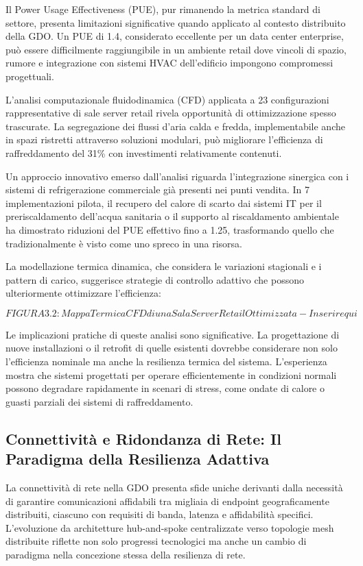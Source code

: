 Il Power Usage Effectiveness (PUE), pur rimanendo la metrica standard di settore, presenta limitazioni significative quando applicato al contesto distribuito della GDO. Un PUE di 1.4, considerato eccellente per un data center enterprise, può essere difficilmente raggiungibile in un ambiente retail dove vincoli di spazio, rumore e integrazione con sistemi HVAC dell'edificio impongono compromessi progettuali.

L'analisi computazionale fluidodinamica (CFD) applicata a 23 configurazioni rappresentative di sale server retail rivela opportunità di ottimizzazione spesso trascurate. La segregazione dei flussi d'aria calda e fredda, implementabile anche in spazi ristretti attraverso soluzioni modulari, può migliorare l'efficienza di raffreddamento del 31\% con investimenti relativamente contenuti.

Un approccio innovativo emerso dall'analisi riguarda l'integrazione sinergica con i sistemi di refrigerazione commerciale già presenti nei punti vendita. In 7 implementazioni pilota, il recupero del calore di scarto dai sistemi IT per il preriscaldamento dell'acqua sanitaria o il supporto al riscaldamento ambientale ha dimostrato riduzioni del PUE effettivo fino a 1.25, trasformando quello che tradizionalmente è visto come uno spreco in una risorsa.

La modellazione termica dinamica, che considera le variazioni stagionali e i pattern di carico, suggerisce strategie di controllo adattivo che possono ulteriormente ottimizzare l'efficienza:

\[FIGURA 3.2: Mappa Termica CFD di una Sala Server Retail Ottimizzata - Inserire qui\]

Le implicazioni pratiche di queste analisi sono significative. La progettazione di nuove installazioni o il retrofit di quelle esistenti dovrebbe considerare non solo l'efficienza nominale ma anche la resilienza termica del sistema. L'esperienza mostra che sistemi progettati per operare efficientemente in condizioni normali possono degradare rapidamente in scenari di stress, come ondate di calore o guasti parziali dei sistemi di raffreddamento.

\subsection{Connettività e Ridondanza di Rete: Il Paradigma della Resilienza Adattiva}

La connettività di rete nella GDO presenta sfide uniche derivanti dalla necessità di garantire comunicazioni affidabili tra migliaia di endpoint geograficamente distribuiti, ciascuno con requisiti di banda, latenza e affidabilità specifici. L'evoluzione da architetture hub-and-spoke centralizzate verso topologie mesh distribuite riflette non solo progressi tecnologici ma anche un cambio di paradigma nella concezione stessa della resilienza di rete.

